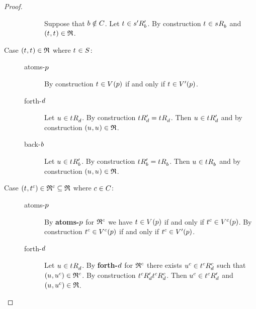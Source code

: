 \begin{proof}
\begin{description}
\begin{description}
                Suppose that $\agentB \notin \agentsC$.
                Let $\kStateT \in \kSuccessorsPB{\kStateSP}$.
                By construction $\kStateT \in \kSuccessorsB{\kStateS}$ and $(\kStateT, \kStateT) \in \refinement$.
        \end{description}
    \item[{Case $(\kStateT, \kStateT) \in \refinement$ where $\kStateT \in \kStates$:}]
        \hfill
        \begin{description}
            \item[atoms-$\atomP$] 
                By construction $\kStateT \in \kValuation(\atomP)$ if and only if $\kStateT \in \kValuationP(\atomP)$.
            \item[forth-$\agentD$]
                Let $\kStateU \in \kSuccessorsD{\kStateT}$.
                By construction $\kSuccessorsPD{\kStateT} = \kSuccessorsD{\kStateT}$.
                Then $\kStateU \in \kSuccessorsPD{\kStateT}$ and by construction $(\kStateU, \kStateU) \in \refinement$.
            \item[back-$\agentB$]
                Let $\kStateU \in \kSuccessorsPB{\kStateT}$.
                By construction $\kSuccessorsPB{\kStateT} = \kSuccessorsB{\kStateT}$.
                Then $\kStateU \in \kSuccessorsB{\kStateT}$ and by construction $(\kStateU, \kStateU) \in \refinement$.
        \end{description}
    \item[{Case $(\kStateT, \kStateT[\agentC]) \in \refinement^\agentC \subseteq \refinement$ where $\agentC \in \agentsC$:}]
        \hfill
        \begin{description}
            \item[atoms-$\atomP$] 
                By {\bf atoms-$\atomP$} for $\refinement^\agentC$ we have $\kStateT \in \kValuation(\atomP)$ if and only if $\kStateT[\agentC] \in \kValuation[\agentC](\atomP)$.
                By construction $\kStateT[\agentC] \in \kValuation[\agentC](\atomP)$ if and only if $\kStateT[\agentC] \in \kValuationP(\atomP)$.
            \item[forth-$\agentD$]
                Let $\kStateU \in \kSuccessorsD{\kStateT}$.
                By {\bf forth-$\agentD$} for $\refinement^\agentC$ there exists $\kStateU[\agentC] \in \kSuccessorsD[\agentC]{\kStateT[\agentC]}$ such that $(\kStateU, \kStateU[\agentC]) \in \refinement^\agentC$.
                By construction $\kSuccessorsPD{\kStateT[\agentC]} \kSuccessorsD[\agentC]{\kStateT[\agentC]}$.
                Then $\kStateU[\agentC] \in \kSuccessorsPD{\kStateT[\agentC]}$ and $(\kStateU, \kStateU[\agentC]) \in \refinement$.

\end{description}
\end{description}
\end{proof}
